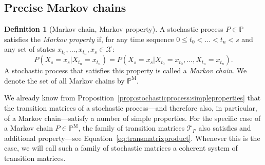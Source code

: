\documentclass[10pt]{paper}
\theoremstyle{definition}
\newtheorem{corollary}[theorem]{Corollary}
\newtheorem{definition}{Definition}
\newcommand{\reals}{\mathbb{R}}
\newcommand{\realspos}{\reals_{>0}}
\newcommand{\realsnonneg}{\reals_{\geq 0}}
\newcommand{\states}{\mathcal{X}}
\newcommand{\processes}{\mathbb{P}}
\newcommand{\mprocesses}{\processes^{\mathrm{M}}}
\newcommand{\norm}[1]{\left\lVert #1 \right\rVert}
\begin{document}
%

\subsection{Precise Markov chains}

\begin{definition}[Markov chain, Markov property]\label{def:markov_property}
A stochastic process $P\in\processes$ satisfies the \emph{Markov property} if, for any time sequence $0\leq t_0<\dots<t_{n}<s$ and any set of states $x_{t_0},\dots,x_{t_n},x_s\in\states$:
\begin{equation*}
P(X_s=x_s\vert X_{t_n}=x_{t_n})=P(X_s=x_s\vert X_{t_0}=x_{t_0}, \dots, X_{t_n}=x_{t_n}).
\end{equation*}
A stochastic process that satisfies this property is called a \emph{Markov chain}. We denote the set of all Markov chains by $\mprocesses$.
\end{definition}


We already know from Proposition~\ref{prop:stochasticprocess:simpleproperties} that the transition matrices of a stochastic process---and therefore also, in particular, of a Markov chain---satisfy a number of simple properties. For the specific case of a Markov chain $P\in\mprocesses$, the family of transition matrices $\mathcal{T}_P$ also satisfies and additional property---see Equation~\eqref{eq:transmatrixproduct}. Whenever this is the case, we will call such a family of stochastic matrices a coherent system of transition matrices.
\end{document}
